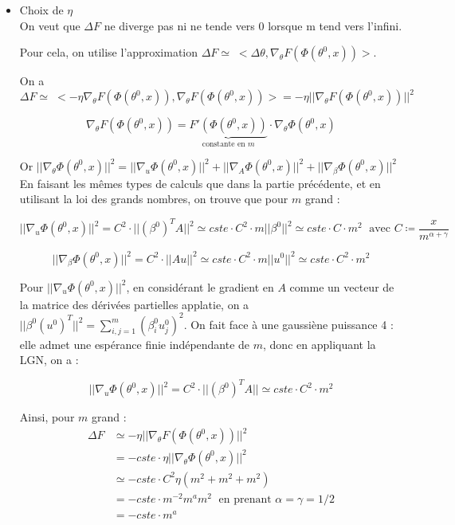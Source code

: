 \documentclass[a4paper, 11pt, french]{article}
\begin{document}
	\begin{itemize}
		
		\item Choix de $\eta$  \\
		
		On veut que $\Delta F$ ne diverge pas ni ne tende vers 0 lorsque m tend vers l'infini.
		
		Pour cela, on utilise l'approximation 
		$\Delta F \simeq \; < \Delta \theta, \nabla_{\theta} F(\Phi(\theta^0, x)) >$.
		
		On a 
		\[
			\Delta F \simeq \; < -\eta \nabla_{\theta} F(\Phi(\theta^0, x)) , \nabla_{\theta} F(\Phi(\theta^0, x)) > = -\eta || \nabla_{\theta} F(\Phi(\theta^0, x)) ||^2
		\]
		
		\[
			\nabla_{\theta} F(\Phi(\theta^0, x)) = 
			\underbrace{F'(\Phi(\theta^0, x))}_\text{constante en $m$} 
			\cdot \nabla_{\theta} \Phi(\theta^0, x)
		\]
		
		Or $ || \nabla_{\theta} \Phi(\theta^0, x) ||^2 = || \nabla_{u} \Phi(\theta^0, x) ||^2
		+ || \nabla_{A} \Phi(\theta^0, x) ||^2 + || \nabla_{\beta} \Phi(\theta^0, x) ||^2 $ \\
		
		En faisant les mêmes types de calculs que dans la partie précédente, et en utilisant la loi des grands nombres, on trouve que pour $m$ grand :
		
		\[ || \nabla_{u} \Phi(\theta^0, x) ||^2 = C^2 \cdot || (\beta^0)^T A ||^2 \simeq
		cste \cdot C^2 \cdot m ||\beta^0||^2 \simeq cste \cdot C \cdot m^2 \; 
		\text{ avec $C \coloneqq \frac{x}{m^{\alpha + \gamma}}$} \]
		
		\[ || \nabla_{\beta} \Phi(\theta^0, x) ||^2 = C^2 \cdot || A u ||^2 \simeq
		cste \cdot C^2 \cdot m ||u^0||^2 \simeq cste \cdot C^2 \cdot m^2 \]
		
		Pour $|| \nabla_{u} \Phi(\theta^0, x) ||^2$, en considérant le gradient en $A$ comme un vecteur de la matrice des dérivées partielles applatie, on a 
		$|| \beta^0 (u^0)^T ||^2 = \sum_{i,j = 1}^m (\beta^0_i u^0_j)^2$. On fait face à une gaussiène puissance 4 : elle admet une espérance finie indépendante de $m$, donc en appliquant la LGN, on a :
		
		\[ || \nabla_{u} \Phi(\theta^0, x) ||^2 = C^2 \cdot || (\beta^0)^T A || \simeq
		cste \cdot C^2 \cdot m^2 \]
		
		Ainsi, pour $m$ grand :
		\begin{align*}
			\Delta F &\simeq -\eta || \nabla_{\theta} F(\Phi(\theta^0, x)) ||^2 \\
			&= - cste \cdot \eta || \nabla_{\theta} \Phi(\theta^0, x) ||^2 \\
			&\simeq - cste \cdot C^2 \eta (m^2 + m^2 + m^2) \\
			&= -cste \cdot m^{-2} m^a m^2 \; \text{ en prenant $\alpha = \gamma = 1/2$}\\
			&= -cste \cdot  m^a
		\end{align*}	
		

\end{itemize}
\end{document}
